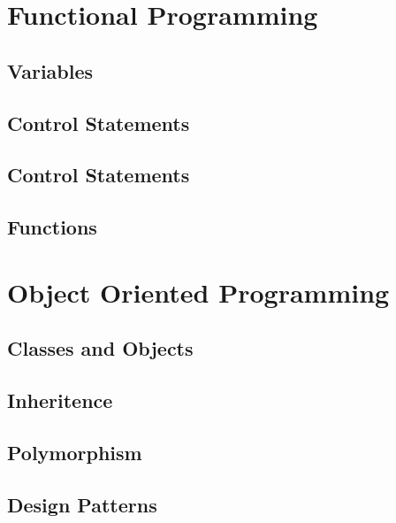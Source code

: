 \documentclass[10pt,a4paper,titlepage]{book}
\begin{document}
\chapter{Functional Programming}

\vfill
\pagebreak
\section{Variables}

\vfill
\pagebreak
\section{Control Statements}

\vfill
\pagebreak
\section{Control Statements~}

\vfill
\pagebreak
\section{Functions}

\vfill
\pagebreak
\chapter{Object Oriented Programming}

\vfill
\pagebreak
\section{Classes and Objects}

\vfill
\pagebreak
\section{Inheritence}

\vfill
\pagebreak
\section{Polymorphism}

\vfill
\pagebreak
\section{Design Patterns}

\vfill
\pagebreak
\end{document}
